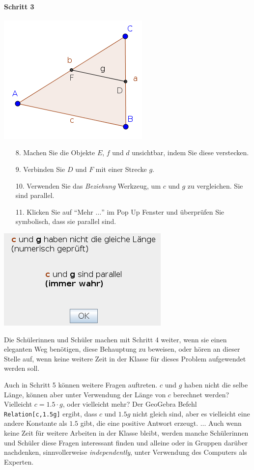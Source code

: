 \documentclass{article}
\begin{document}
\paragraph{Schritt 3}
\begin{center}
\includegraphics[scale=0.5]{classroom3}
\end{center}
\begin{enumerate}
    \item[8.] Machen Sie die Objekte $E$, $f$ und $d$ unsichtbar, indem Sie diese verstecken.
    \item[9.] Verbinden Sie $D$ und $F$ mit einer Strecke $g$.
    \item[10.] Verwenden Sie das  \textit{Beziehung} Werkzeug, um $c$ und $g$ zu vergleichen. Sie sind parallel.
    \item[11.] Klicken Sie auf ``Mehr $\ldots$'' im Pop Up Fenster und überprüfen Sie symbolisch, dass sie parallel sind.
\end{enumerate}
\begin{center}
\includegraphics[scale=0.5]{classroom3-Relation-de}
\end{center}
Die Schülerinnen und  Schüler machen mit Schritt 4 weiter, wenn sie einen eleganten Weg benötigen, diese Behauptung zu beweisen, oder hören an dieser Stelle auf, wenn keine weitere Zeit in der Klasse für dieses Problem aufgewendet werden soll.

Auch in Schritt 5 können weitere Fragen auftreten. $c$ und $g$ haben nicht die selbe Länge, können aber unter Verwendung der Länge von $c$ berechnet werden? Vielleicht $c=1.5\cdot g$, oder vielleicht mehr? Der GeoGebra Befehl \texttt{Relation[c,1.5g]} ergibt, dass $c$ und $1.5g$ nicht gleich sind, aber es vielleicht eine andere Konstante als $1.5$ gibt, die eine positive Antwort erzeugt. $\ldots$ Auch wenn keine Zeit für weitere Arbeiten in der Klasse bleibt, werden manche Schülerinnen und Schüler diese Fragen interessant finden und alleine oder in Gruppen darüber nachdenken, sinnvollerweise  \textit{independently}, unter Verwendung des Computers als Experten.
\end{document}
